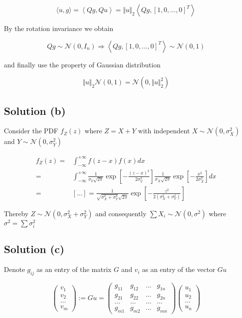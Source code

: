 \documentclass{article}
\begin{document}
$$\langle u, g \rangle = \left\langle Qg, Q u \right\rangle = \Vert u \Vert_2 \left\langle Qg, [1, 0, \dots, 0]^T \right\rangle$$

By the rotation invariance we obtain

$$Qg \sim \mathcal N(0, I_n) \Rightarrow \left\langle Qg, [1, 0, \dots, 0]^T \right\rangle \sim \mathcal N(0, 1)$$

and finally use the property of Gaussian distribution

$$\Vert u \Vert_2 \mathcal N(0, 1) = \mathcal N(0, \Vert u \Vert_2^2)$$

\subsection{Solution (b)}

Consider the PDF $f_Z(z)$ where $Z = X + Y$ with independent $X \sim \mathcal N(0, \sigma_X^2)$ and $Y \sim \mathcal N(0, \sigma_Y^2)$

\begin{equation*}
    \begin{aligned}
        f_Z(z) = & \int_{-\infty}^{+\infty} f(z-x)f(x)dx \\
        = & \int_{-\infty}^{+\infty} \frac{1}{\sigma_Y\sqrt{2 \pi}} \exp \left[ -\frac{(z - x)^2}{2 \sigma_Y^2} \right] \frac{1}{\sigma_X\sqrt{2 \pi}} \exp \left[ -\frac{x^2}{2 \sigma_X^2} \right] dx \\
        = & [\dots] = \frac{1}{\sqrt{\sigma_X^2 + \sigma_Y^2}\sqrt{2 \pi}} \exp \left[ -\frac{z^2}{2 (\sigma_X^2 + \sigma_Y^2)} \right]
    \end{aligned}
\end{equation*}

Thereby $Z \sim \mathcal N(0, \sigma_X^2 + \sigma_Y^2)$ and consequently $\sum X_i \sim \mathcal N(0, \sigma^2)$ where $\sigma^2 = \sum \sigma_i^2$

\subsection{Solution (c)}

Denote $g_{ij}$ as an entry of the matrix $G$ and $v_i$ as an entry of the vector $Gu$

$$
\begin{pmatrix}
    v_1 \\
    v_2 \\
    \dots \\
    v_m
\end{pmatrix} :=
Gu = 
\begin{pmatrix}
    g_{11} & g_{12} & \dots & g_{1n} \\
    g_{21} & g_{22} & \dots & g_{2n} \\
    \dots & \dots & \dots & \dots \\
    g_{m1} & g_{m2} & \dots & g_{mn}
\end{pmatrix}
\begin{pmatrix}
    u_1 \\
    u_2 \\
    \dots \\
    u_n
\end{pmatrix}
$$
\end{document}
